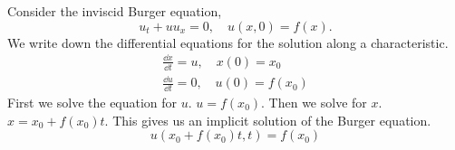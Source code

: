 \begin{Example}
  Consider the inviscid Burger equation,
  \[
  u_t + u u_x = 0, \quad u(x,0) = f(x).
  \]
  We write down the differential equations for the solution along a 
  characteristic.
  \begin{gather*}
    \frac{\dd x}{\dd t} = u, \quad x(0) = x_0
    \\
    \frac{\dd u}{\dd t} = 0, \quad u(0) = f(x_0)
  \end{gather*}
  First we solve the equation for $u$.  $u = f(x_0)$.  Then we solve for $x$.
  $x = x_0 + f(x_0) t$.  This gives us an implicit solution of the Burger equation.
  \[
  u(x_0 + f(x_0) t, t) = f(x_0)
  \]
\end{Example}











